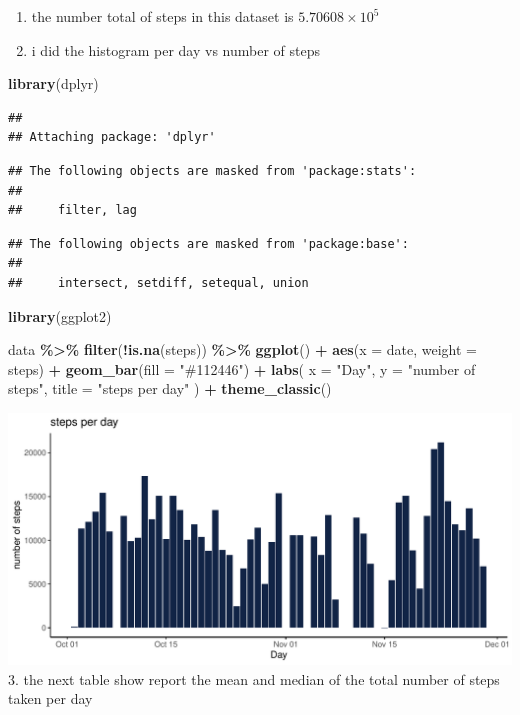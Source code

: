 \documentclass[
]{article}
\newenvironment{Shaded}{\begin{snugshade}}{\end{snugshade}}
\newcommand{\AttributeTok}[1]{\textcolor[rgb]{0.13,0.29,0.53}{#1}}
\newcommand{\FunctionTok}[1]{\textcolor[rgb]{0.13,0.29,0.53}{\textbf{#1}}}
\newcommand{\NormalTok}[1]{#1}
\newcommand{\SpecialCharTok}[1]{\textcolor[rgb]{0.81,0.36,0.00}{\textbf{#1}}}
\newcommand{\StringTok}[1]{\textcolor[rgb]{0.31,0.60,0.02}{#1}}
\begin{document}
\begin{enumerate}
\def\labelenumi{\arabic{enumi}.}
\item
  the number total of steps in this dataset is
  \ensuremath{5.70608\times 10^{5}}
\item
  i did the histogram per day vs number of steps
\end{enumerate}

\begin{Shaded}
\begin{Highlighting}[]
\FunctionTok{library}\NormalTok{(dplyr)}
\end{Highlighting}
\end{Shaded}

\begin{verbatim}
## 
## Attaching package: 'dplyr'
\end{verbatim}

\begin{verbatim}
## The following objects are masked from 'package:stats':
## 
##     filter, lag
\end{verbatim}

\begin{verbatim}
## The following objects are masked from 'package:base':
## 
##     intersect, setdiff, setequal, union
\end{verbatim}

\begin{Shaded}
\begin{Highlighting}[]
\FunctionTok{library}\NormalTok{(ggplot2)}

\NormalTok{data }\SpecialCharTok{\%\textgreater{}\%}
 \FunctionTok{filter}\NormalTok{(}\SpecialCharTok{!}\FunctionTok{is.na}\NormalTok{(steps)) }\SpecialCharTok{\%\textgreater{}\%}
 \FunctionTok{ggplot}\NormalTok{() }\SpecialCharTok{+}
  \FunctionTok{aes}\NormalTok{(}\AttributeTok{x =}\NormalTok{ date, }\AttributeTok{weight =}\NormalTok{ steps) }\SpecialCharTok{+}
  \FunctionTok{geom\_bar}\NormalTok{(}\AttributeTok{fill =} \StringTok{"\#112446"}\NormalTok{) }\SpecialCharTok{+}
  \FunctionTok{labs}\NormalTok{(}
    \AttributeTok{x =} \StringTok{"Day"}\NormalTok{,}
    \AttributeTok{y =} \StringTok{"number of steps"}\NormalTok{,}
    \AttributeTok{title =} \StringTok{"steps per day"}
\NormalTok{  ) }\SpecialCharTok{+}
  \FunctionTok{theme\_classic}\NormalTok{()}
\end{Highlighting}
\end{Shaded}

\includegraphics{project1_files/figure-latex/unnamed-chunk-4-1.pdf} 3.
the next table show report the mean and median of the total number of
steps taken per day
\end{document}
